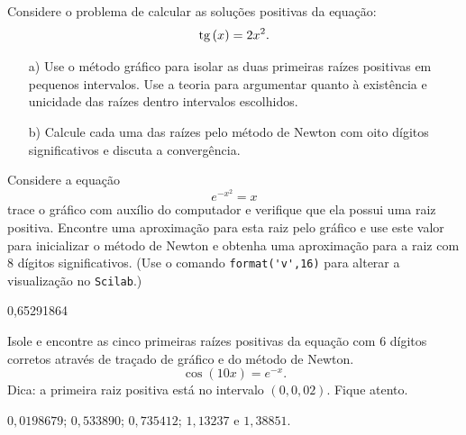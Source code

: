 \begin{ex}
\begin{exer} Considere o problema de calcular as soluções positivas da equação:
  \begin{equation}
    \operatorname{tg}\,(x)=2x^2.
  \end{equation}
\begin{itemize}
\item[a)] Use o método gráfico para isolar as duas primeiras raízes positivas em pequenos intervalos. Use a teoria para argumentar quanto à existência e unicidade das raízes dentro intervalos escolhidos.
\item[b)]  Calcule cada uma das raízes pelo método de Newton com oito dígitos significativos e discuta a convergência.%
\end{itemize}
\end{exer}

\begin{exer}\label{new1} Considere a equação
  \begin{equation} e^{-x^2}=x \end{equation}
trace o gráfico com auxílio do computador e verifique que ela possui uma raiz positiva. Encontre uma aproximação para esta raiz pelo gráfico e use este valor para inicializar o método de Newton e obtenha uma aproximação para a raiz com 8 dígitos significativos. \ifisscilab (Use o comando \verb+format('v',16)+ para alterar a visualização no \verb+Scilab+.)\fi
\end{exer}
\begin{resp}
  0,65291864
  \end{resp}

\begin{exer}\label{new2} Isole e encontre as cinco primeiras raízes positivas da equação com 6 dígitos corretos através de traçado de gráfico e do método de Newton.
\begin{equation} \cos(10x)=e^{-x}. \end{equation} Dica: a primeira raiz positiva está no intervalo $(0, 0,02)$. Fique atento.
\end{exer}
\begin{resp}
   $0,0198679$; $0,533890$; $0,735412$; $1,13237$ e $1,38851$.
  \end{resp}



\end{ex}
